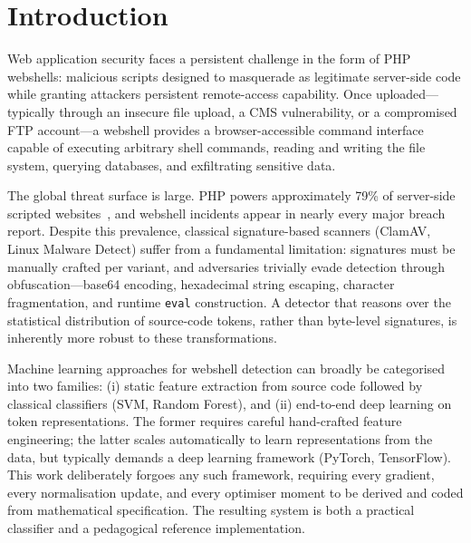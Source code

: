 \documentclass[10pt,conference,letterpaper]{IEEEtran}
\begin{document}
\section{Introduction}
\label{sec:intro}

Web application security faces a persistent challenge in the form of PHP webshells:
malicious scripts designed to masquerade as legitimate server-side code while
granting attackers persistent remote-access capability. Once uploaded---typically
through an insecure file upload, a CMS vulnerability, or a compromised FTP
account---a webshell provides a browser-accessible command interface capable of
executing arbitrary shell commands, reading and writing the file system, querying
databases, and exfiltrating sensitive data.

The global threat surface is large. PHP powers approximately 79\% of server-side
scripted websites~\cite{w3techs2024}, and webshell incidents appear in nearly every
major breach report. Despite this prevalence, classical signature-based scanners
(ClamAV, Linux Malware Detect) suffer from a fundamental limitation: signatures
must be manually crafted per variant, and adversaries trivially evade detection
through obfuscation---base64 encoding, hexadecimal string escaping, character
fragmentation, and runtime \texttt{eval} construction. A detector that reasons
over the statistical distribution of source-code tokens, rather than byte-level
signatures, is inherently more robust to these transformations.

Machine learning approaches for webshell detection can broadly be categorised into
two families: (i) static feature extraction from source code followed by classical
classifiers (SVM, Random Forest), and (ii) end-to-end deep learning on token
representations. The former requires careful hand-crafted feature engineering;
the latter scales automatically to learn representations from the data, but
typically demands a deep learning framework (PyTorch, TensorFlow). This work
deliberately forgoes any such framework, requiring every gradient, every
normalisation update, and every optimiser moment to be derived and coded from
mathematical specification. The resulting system is both a practical classifier
and a pedagogical reference implementation.
\end{document}
